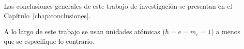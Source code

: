 Las conclusiones generales de este trabajo de investigación se presentan 
en el Capítulo~\ref{chap:conclusiones}.

A lo largo de este trabajo se usan unidades atómicas ($\hbar=e=m_e=1$)
a menos que se especifique lo contrario.


\begin{comment}

Potenciales usados aqui para describir las estructuras atómicas y moleculares

\begin{itemize}
\item Método de inversión depurada
\item Método de potencial paramétrico de Klapish (1971)
\item Potenciales modelo (TFDA, STO + pol pot paramétricos)
\end{itemize}





Idea para intro de Chap4: 


\end{comment}
